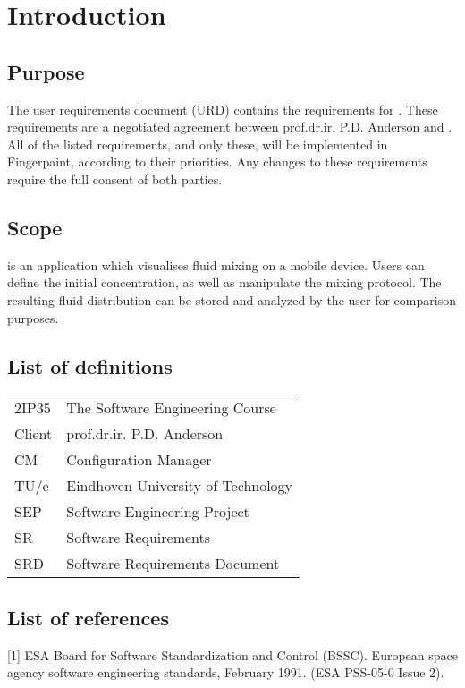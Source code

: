 \chapter{Introduction}

\section{Purpose}
The user requirements document (URD) contains the requirements for \projectname. These requirements are a negotiated agreement between prof.dr.ir. P.D. Anderson and \projectauthor. All of the listed requirements, and only these, will be implemented in Fingerpaint, according to their priorities. Any changes to these requirements require the full consent of both parties.

\section{Scope}
\projectname is an application which visualises fluid mixing on a mobile device. Users can define the initial concentration, as well as manipulate the mixing protocol. The resulting fluid distribution can be stored and analyzed by the user for comparison purposes.

\section{List of definitions}
\begin{tabular}{l|l}
2IP35 & The Software Engineering Course \\
Client & prof.dr.ir. P.D. Anderson \\
CM    &Configuration Manager \\
TU/e  &Eindhoven University of Technology \\
SEP   &Software Engineering Project \\
SR    &Software Requirements \\
SRD   &Software Requirements Document \\
\end{tabular}

\section{List of references}


[1] ESA Board for Software Standardization and Control (BSSC). European space agency software
engineering standards, February 1991. (ESA PSS-05-0 Issue 2).


